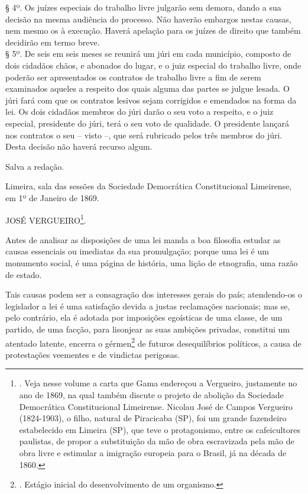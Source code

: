 § 4º. Os juízes especiais do trabalho livre julgarão sem demora, dando a
sua decisão na mesma audiência do processo. Não haverão embargos nestas
causas, nem mesmo os à execução. Haverá apelação para os juízes de
direito que também decidirão em termo breve.\\
§ 5º. De seis em seis meses se reunirá um júri em cada município,
composto de dois cidadãos chãos, e abonados do lugar, e o juiz especial
do trabalho livre, onde poderão ser apresentados os contratos de
trabalho livre a fim de serem examinados aqueles a respeito dos quais
alguma das partes se julgue lesada. O júri fará com que os contratos
lesivos sejam corrigidos e emendados na forma da lei. Os dois cidadãos
membros do júri darão o seu voto a respeito, e o juiz especial,
presidente do júri, terá o seu voto de qualidade. O presidente lançará
nos contratos o seu -- visto --, que será rubricado pelos três membros
do júri. Desta decisão não haverá recurso algum.

Salva a redação.

Limeira, sala das sessões da Sociedade Democrática Constitucional
Limeirense, em 1º de Janeiro de 1869.

JOSÉ VERGUEIRO\footnote{. Veja nesse volume a carta que Gama endereçou a
  Vergueiro, justamente no ano de 1869, na qual também discute o projeto
  de abolição da Sociedade Democrática Constitucional Limeirense.
  Nicolau José de Campos Vergueiro (1824-1903), o filho, natural de
  Piracicaba (SP), foi um grande fazendeiro estabelecido em Limeira
  (SP), que teve o protagonismo, entre os cafeicultores paulistas, de
  propor a substituição da mão de obra escravizada pela mão de obra
  livre e estimular a imigração europeia para o Brasil, já na década de
  1860.}.

Antes de analisar as disposições de uma lei manda a boa filosofia
estudar as causas essenciais ou imediatas da sua promulgação; porque uma
lei é um monumento social, é uma página de história, uma lição de
etnografia, uma razão de estado.

Tais causas podem ser a consagração dos interesses gerais do país;
atendendo-os o legislador a lei é uma satisfação devida a justas
reclamações nacionais; mas se, pelo contrário, ela é adotada por
imposições egoísticas de uma classe, de um partido, de uma facção, para
lisonjear as suas ambições privadas, constitui um atentado latente,
encerra o gérmen\footnote{. Estágio inicial do desenvolvimento de um
  organismo.} de futuros desequilíbrios políticos, a causa de
protestações veementes e de vindictas perigosas.

